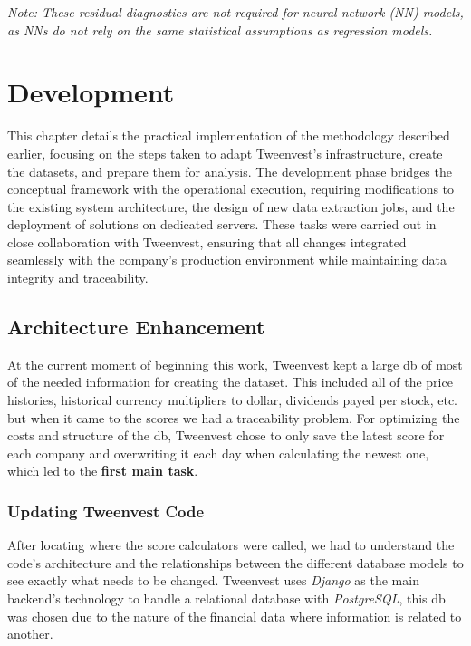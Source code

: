\documentclass[11pt,english,a4paper,hidelinks]{book}
\begin{document}
\noindent \textit{Note: These residual diagnostics are not required for neural network (NN) models, as NNs do not rely on the same statistical assumptions as regression models.}

\chapter{Development}

\noindent This chapter details the practical implementation of the methodology described earlier, focusing on the steps taken to adapt Tweenvest’s infrastructure, create the datasets, and prepare them for analysis. The development phase bridges the conceptual framework with the operational execution, requiring modifications to the existing system architecture, the design of new data extraction jobs, and the deployment of solutions on dedicated servers. These tasks were carried out in close collaboration with Tweenvest, ensuring that all changes integrated seamlessly with the company’s production environment while maintaining data integrity and traceability.

\section{Architecture Enhancement}

\noindent At the current moment of beginning this work, Tweenvest kept a large \gls{db} of most of the needed information for creating the dataset. This included all of the price histories, historical currency multipliers to dollar, dividends payed per stock, etc. but when it came to the scores we had a traceability problem. For optimizing the costs and structure of the \acrshort{db}, Tweenvest chose to only save the latest score for each company and overwriting it each day when calculating the newest one, which led to the \textbf{first main task}.

\subsection{Updating Tweenvest Code}

After locating where the score calculators were called, we had to understand the code's architecture and the relationships between the different database models to see exactly what needs to be changed. Tweenvest uses \textit{Django} as the main backend's technology to handle a relational database with \textit{PostgreSQL}, this \acrshort{db} was chosen due to the nature of the financial data where information is related to another.
\end{document}
